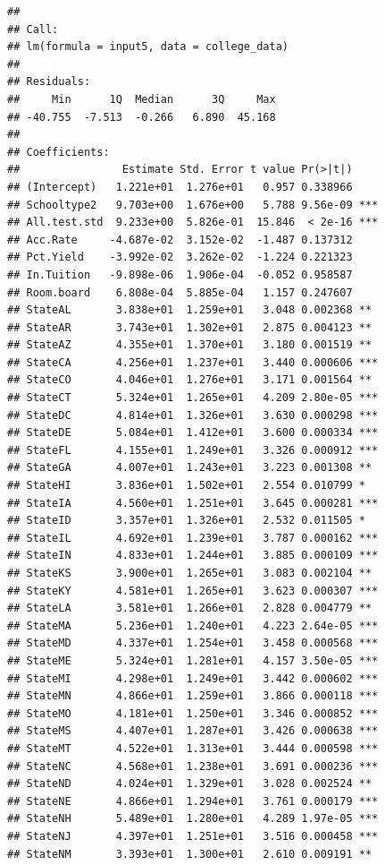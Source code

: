 \documentclass[]{article}
\begin{document}
\begin{verbatim}
## 
## Call:
## lm(formula = input5, data = college_data)
## 
## Residuals:
##     Min      1Q  Median      3Q     Max 
## -40.755  -7.513  -0.266   6.890  45.168 
## 
## Coefficients:
##                Estimate Std. Error t value Pr(>|t|)    
## (Intercept)   1.221e+01  1.276e+01   0.957 0.338966    
## Schooltype2   9.703e+00  1.676e+00   5.788 9.56e-09 ***
## All.test.std  9.233e+00  5.826e-01  15.846  < 2e-16 ***
## Acc.Rate     -4.687e-02  3.152e-02  -1.487 0.137312    
## Pct.Yield    -3.992e-02  3.262e-02  -1.224 0.221323    
## In.Tuition   -9.898e-06  1.906e-04  -0.052 0.958587    
## Room.board    6.808e-04  5.885e-04   1.157 0.247607    
## StateAL       3.838e+01  1.259e+01   3.048 0.002368 ** 
## StateAR       3.743e+01  1.302e+01   2.875 0.004123 ** 
## StateAZ       4.355e+01  1.370e+01   3.180 0.001519 ** 
## StateCA       4.256e+01  1.237e+01   3.440 0.000606 ***
## StateCO       4.046e+01  1.276e+01   3.171 0.001564 ** 
## StateCT       5.324e+01  1.265e+01   4.209 2.80e-05 ***
## StateDC       4.814e+01  1.326e+01   3.630 0.000298 ***
## StateDE       5.084e+01  1.412e+01   3.600 0.000334 ***
## StateFL       4.155e+01  1.249e+01   3.326 0.000912 ***
## StateGA       4.007e+01  1.243e+01   3.223 0.001308 ** 
## StateHI       3.836e+01  1.502e+01   2.554 0.010799 *  
## StateIA       4.560e+01  1.251e+01   3.645 0.000281 ***
## StateID       3.357e+01  1.326e+01   2.532 0.011505 *  
## StateIL       4.692e+01  1.239e+01   3.787 0.000162 ***
## StateIN       4.833e+01  1.244e+01   3.885 0.000109 ***
## StateKS       3.900e+01  1.265e+01   3.083 0.002104 ** 
## StateKY       4.581e+01  1.265e+01   3.623 0.000307 ***
## StateLA       3.581e+01  1.266e+01   2.828 0.004779 ** 
## StateMA       5.236e+01  1.240e+01   4.223 2.64e-05 ***
## StateMD       4.337e+01  1.254e+01   3.458 0.000568 ***
## StateME       5.324e+01  1.281e+01   4.157 3.50e-05 ***
## StateMI       4.298e+01  1.249e+01   3.442 0.000602 ***
## StateMN       4.866e+01  1.259e+01   3.866 0.000118 ***
## StateMO       4.181e+01  1.250e+01   3.346 0.000852 ***
## StateMS       4.407e+01  1.287e+01   3.426 0.000638 ***
## StateMT       4.522e+01  1.313e+01   3.444 0.000598 ***
## StateNC       4.568e+01  1.238e+01   3.691 0.000236 ***
## StateND       4.024e+01  1.329e+01   3.028 0.002524 ** 
## StateNE       4.866e+01  1.294e+01   3.761 0.000179 ***
## StateNH       5.489e+01  1.280e+01   4.289 1.97e-05 ***
## StateNJ       4.397e+01  1.251e+01   3.516 0.000458 ***
## StateNM       3.393e+01  1.300e+01   2.610 0.009191 ** 

\end{verbatim}
\end{document}
